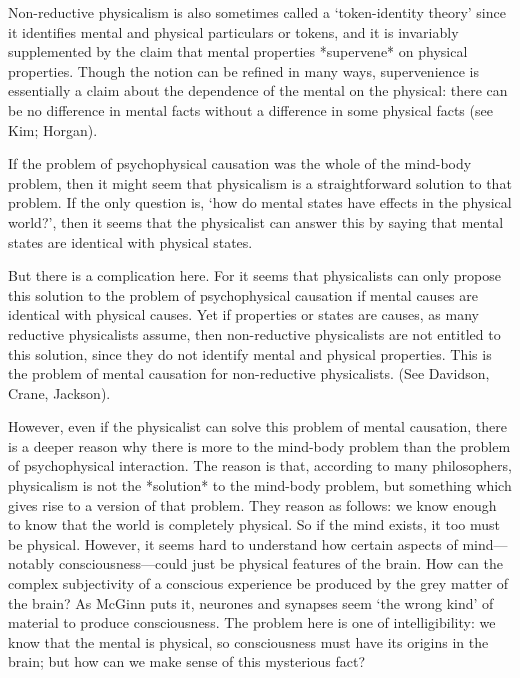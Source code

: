 Non-reductive physicalism is also sometimes called a ‘token-identity theory’
since it identifies mental and physical particulars or tokens, and it is invariably
supplemented by the claim that mental properties *supervene* on physical
properties. Though the notion can be refined in many ways, supervenience is
essentially a claim about the dependence of the mental on the physical: there can be
no difference in mental facts without a difference in some physical facts (see Kim\autocite{Kim1}; Horgan\autocite{Horgan1}).

If the problem of psychophysical causation was the whole of the mind-body
problem, then it might seem that physicalism is a straightforward solution to that
problem. If the only question is, ‘how do mental states have effects in the physical
world?’, then it seems that the physicalist can answer this by saying that mental
states are identical with physical states.

But there is a complication here. For it seems that physicalists can only propose
this solution to the problem of psychophysical causation if mental causes are
identical with physical causes. Yet if properties or states are causes, as many
reductive physicalists assume, then non-reductive physicalists are not entitled to this
solution, since they do not identify mental and physical properties. This is the problem of mental causation for non-reductive physicalists. (See Davidson\autocite{Davidson2},
Crane\autocite{Crane2}, Jackson\autocite{Jackson1}).

However, even if the physicalist can solve this problem of mental causation,
there is a deeper reason why there is more to the mind-body problem than the
problem of psychophysical interaction. The reason is that, according to many
philosophers, physicalism is not the *solution* to the mind-body problem, but
something which gives rise to a version of that problem. They reason as follows: we
know enough to know that the world is completely physical. So if the mind exists, it
too must be physical. However, it seems hard to understand how certain aspects of
mind—notably consciousness—could just be physical features of the brain. How can
the complex subjectivity of a conscious experience be produced by the grey matter
of the brain? As McGinn\autocite{McGinn1} puts it, neurones and synapses seem ‘the wrong
kind’ of material to produce consciousness. The problem here is one of intelligibility:
we know that the mental is physical, so consciousness must have its origins in the
brain; but how can we make sense of this mysterious fact?

